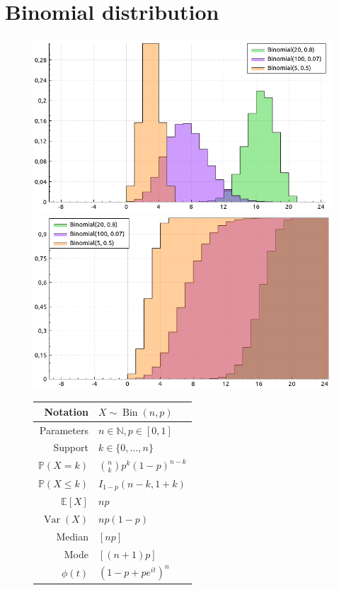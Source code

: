 \documentclass[a4paper,11pt]{article}
\theoremstyle{plain}
\theoremstyle{definition}
\newcommand{\ME}{\mathbb{E}}
\newcommand{\MP}{\mathbb{P}}
\newcommand{\MN}{\mathbb{N}}
\newcommand{\Var}{\operatorname{Var}}
\begin{document}
	\section{Binomial distribution}
	\begin{figure}[!htb]\centering
		\begin{minipage}{0.55\textwidth}
			\includegraphics[width=\linewidth, right]{binomial_pmf}
			\captionsetup{labelformat=empty}
			\includegraphics[width=\linewidth, right]{binomial_cdf}
			\captionsetup{labelformat=empty}
		\end{minipage}
		\begin{minipage}{0.4\textwidth}
			\begin{tabular}{| r | l |}
			\hline
			Notation & $ X \sim \operatorname{Bin}(n, p) $ \\
			\hline
			Parameters & $ n \in \MN, p \in [0, 1]  $ \\
			\hline
			Support & $ k \in \{0, \dots, n  \} $  \\
			\hline
			$\MP(X = k)$ & $\binom{n}{k} p^k (1-p)^{n-k}  $ \\
			\hline
			$\MP(X \leq k)$ & $I_{1-p}(n-k, 1+k) $ \\
			\hline
			$\ME[X]$ & $ np$ \\
			\hline
			$\Var(X)$ & $np(1-p)$ \\
			\hline
			Median & $[np]$ \\
			\hline
			Mode & $[(n+1)p]$ \\
			\hline
			$\phi(t)$ & $ (1-p+pe^{it})^n  $ \\
			\hline
		\end{tabular}
		\end{minipage}
	\end{figure}
	
\end{document}
